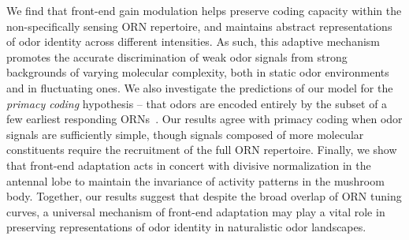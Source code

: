\documentclass[9pt,twocolumn,twoside,lineno]{pnas-new}
\begin{document}
We find that front-end gain modulation helps preserve coding capacity within the non-specifically sensing ORN repertoire, and maintains abstract representations of odor identity across different intensities. As such, this adaptive mechanism promotes the  accurate  discrimination of weak odor signals from strong backgrounds of varying molecular complexity, both in static odor environments  and in fluctuating ones. We also investigate the predictions of our model for the \textit{primacy coding} hypothesis  -- that odors are encoded entirely by the subset of a few earliest responding ORNs~\cite{primacy_coding, primacy_math}. Our results agree with primacy coding when odor signals are sufficiently  simple, though signals composed of more molecular constituents require the recruitment of the full ORN repertoire. Finally, we show that front-end adaptation acts in concert with divisive normalization in the antennal lobe to maintain the invariance of activity patterns  in the  mushroom body. Together, our results suggest that despite the broad overlap of ORN tuning curves, a universal mechanism of front-end adaptation may play a vital role in preserving representations of odor identity in naturalistic odor landscapes.
\end{document}
